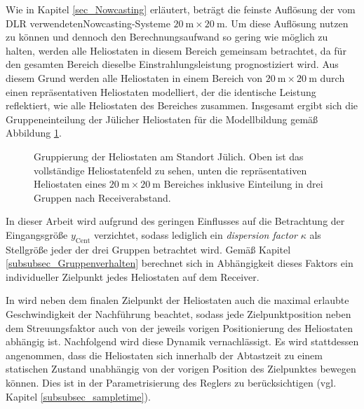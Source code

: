 Wie in Kapitel \ref{sec_Nowcasting} erläutert, beträgt die feinste Auflösung der vom DLR verwendeten\linebreak Nowcasting-Systeme $\SI{20}{\metre} \times \SI{20}{\metre}$.
Um diese Auflösung nutzen zu können und dennoch den Berechnungsaufwand so gering wie möglich zu halten, werden alle Heliostaten in diesem Bereich gemeinsam betrachtet, da für den gesamten Bereich dieselbe Einstrahlungsleistung prognostiziert wird.
Aus diesem Grund werden alle Heliostaten in einem Bereich von $\SI{20}{\metre} \times \SI{20}{\metre}$ durch einen repräsentativen Heliostaten modelliert, der die identische Leistung reflektiert, wie alle Heliostaten des Bereiches zusammen.
Insgesamt ergibt sich die Gruppeneinteilung der Jülicher Heliostaten für die Modellbildung gemäß Abbildung \ref{fig_HeliostatenfeldGruppen}.

\begin{figure}[h!]
    \centering
    \setlength{\fboxsep}{5pt}
    \setlength{\fboxrule}{1pt}
\caption[Gruppierung der Heliostaten am Standort Jülich. Oben ist das vollständige Heliostatenfeld zu sehen, unten die repräsentativen Heliostaten eines $\SI{20}{\metre} \times \SI{20}{\metre}$ Bereiches inklusive Einteilung in drei Gruppen nach Receiverabstand.]{Gruppierung der Heliostaten am Standort Jülich. Oben ist das vollständige Heliostatenfeld zu sehen, unten die repräsentativen Heliostaten eines $\SI{20}{\metre} \times \SI{20}{\metre}$ Bereiches inklusive Einteilung in drei Gruppen nach Receiverabstand.}
    \label{fig_HeliostatenfeldGruppen}
\end{figure}

In dieser Arbeit wird aufgrund des geringen Einflusses auf die Betrachtung der Eingangsgröße $y_{\mathrm{Cent}}$ verzichtet, sodass lediglich ein \textit{dispersion factor} $\kappa$ als Stellgröße jeder der drei Gruppen betrachtet wird.
Gemäß Kapitel \ref{subsubsec_Gruppenverhalten} berechnet sich in Abhängigkeit dieses Faktors ein individueller Zielpunkt jedes Heliostaten auf dem Receiver.

In \cite{Garcia2} wird neben dem finalen Zielpunkt der Heliostaten auch die maximal erlaubte Geschwindigkeit der Nachführung beachtet, sodass jede Zielpunktposition neben dem Streuungsfaktor auch von der jeweils vorigen Positionierung des Heliostaten abhängig ist.
Nachfolgend wird diese Dynamik vernachlässigt.
Es wird stattdessen angenommen, dass die Heliostaten sich innerhalb der Abtastzeit zu einem statischen Zustand unabhängig von der vorigen Position des Zielpunktes bewegen können.
Dies ist in der Parametrisierung des Reglers zu berücksichtigen (vgl. Kapitel \ref{subsubsec_sampletime}).

